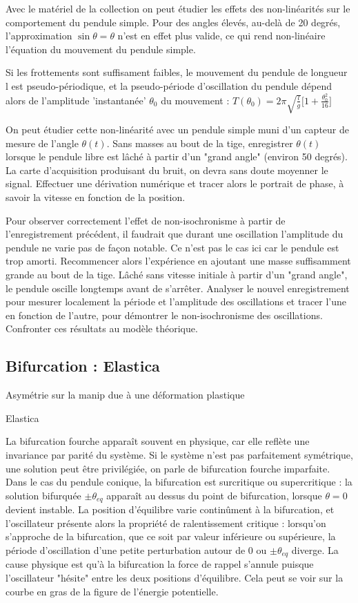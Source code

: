 \documentclass{article}%
\begin{document}
Avec le matériel de la collection on peut étudier les effets des non-linéarités sur le comportement du pendule simple. Pour des angles élevés, au-delà de 20 degrés, l'approximation $\sin \theta = \theta$ n'est en effet plus valide, ce qui rend non-linéaire l'équation du mouvement du pendule simple.

Si les frottements sont suffisament faibles, le mouvement du pendule de longueur l est pseudo-périodique, et la pseudo-période d'oscillation du pendule dépend alors de l'amplitude 'instantanée' $\theta_0$ du mouvement :
$T(\theta_0) = 2\pi\sqrt{\frac{l}{g}} \Bigg[1+\frac{\theta_0^2}{16} \Bigg]$


On peut étudier cette non-linéarité avec un pendule simple muni d'un capteur de mesure de l'angle $\theta(t)$. Sans masses au bout de la tige, enregistrer $\theta(t)$ lorsque le pendule libre est lâché à partir d'un "grand angle" (environ 50 degrés). La carte d'acquisition produisant du bruit, on devra sans doute moyenner le signal. Effectuer une dérivation numérique et tracer alors le portrait de phase, à savoir la vitesse en fonction de la position.

Pour observer correctement l'effet de non-isochronisme à partir de l'enregistrement précédent, il faudrait que durant une oscillation l'amplitude du pendule ne varie pas de façon notable. Ce n'est pas le cas ici car le pendule est trop amorti. Recommencer alors l'expérience en ajoutant une masse suffisamment grande au bout de la tige. Lâché sans vitesse initiale à partir d'un "grand angle", le pendule oscille longtemps avant de s'arrêter. Analyser le nouvel enregistrement pour mesurer localement la période et l'amplitude des oscillations et tracer l'une en fonction de l'autre, pour démontrer le non-isochronisme des oscillations. Confronter ces résultats au modèle théorique. 

\subsection{Bifurcation : Elastica}
Asymétrie sur la manip due à une déformation plastique 

Elastica

La bifurcation fourche apparaît souvent en physique, car elle reflète une invariance par parité du système. Si le système n'est pas parfaitement symétrique, une solution peut être privilégiée, on parle de bifurcation fourche imparfaite. Dans le cas du pendule conique, la bifurcation est surcritique ou supercritique : la solution bifurquée $\pm \theta_{eq}$ apparaît au dessus du point de bifurcation, lorsque $\theta = 0$ devient instable. La position d'équilibre varie continûment à la bifurcation, et l'oscillateur présente alors la propriété de ralentissement critique : lorsqu'on s'approche de la bifurcation, que ce soit par valeur inférieure ou supérieure, la période d'oscillation d'une petite perturbation autour de 0 ou $\pm \theta_{eq}$ diverge. La cause physique est qu'à la bifurcation la force de rappel s'annule puisque l'oscillateur "hésite" entre les deux positions d'équilibre. Cela peut se voir sur la courbe en gras de la figure de l'énergie potentielle.
\end{document}
